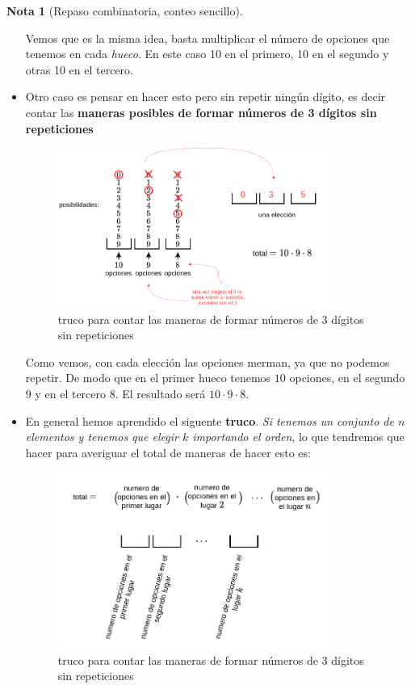 \documentclass[]{book}
\theoremstyle{plain}
\theoremstyle{definition}
\newtheorem{note}[theorem]{Nota}
\begin{document}
\begin{note}[Repaso combinatoria, conteo sencillo]
\begin{itemize}
Vemos que es la misma idea, basta multiplicar el número de opciones que tenemos en cada \emph{hueco}. En este caso 10 en el primero, 10 en el segundo y otras 10 en el tercero.

\item Otro caso es pensar en hacer esto pero sin repetir ningún dígito, es decir contar las \textbf{maneras posibles de formar números de 3 dígitos sin repeticiones}

\begin{figure}[htbp]
  \centering
  \includegraphics[width=3.5in,height=\textheight]{img/conteo_basico_3.png}
  \caption{truco para contar las maneras de formar números de 3 dígitos sin repeticiones}
  \end{figure}%

Como vemos, con cada elección las opciones merman, ya que no podemos repetir. De modo que en el primer hueco tenemos $10$ opciones, en el segundo $9$ y en el tercero $8$. El resultado 
será $10 \cdot 9 \cdot 8$. 

\item En general hemos aprendido el siguente \textbf{truco}. \emph{Si tenemos un conjunto de $n$ elementos y tenemos que elegir $k$ importando el orden},
 lo que tendremos que hacer para averiguar el total de maneras de hacer esto es:

\begin{figure}[htbp]
  \centering
  \includegraphics[width=3.5in,height=\textheight]{img/conteo_basico_4.png}
  \caption{truco para contar las maneras de formar números de 3 dígitos sin repeticiones}
  \end{figure}%

\end{itemize}

\end{note}
\end{document}
